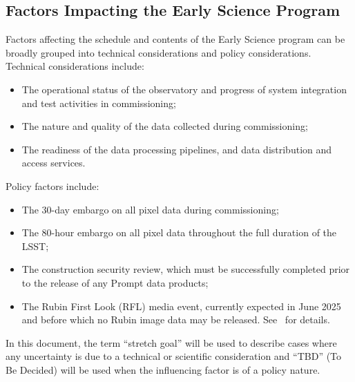 \subsection{Factors Impacting the Early Science Program}
\label{ssec:impact}

Factors affecting the schedule and contents of the Early Science program can be broadly grouped into technical considerations and policy considerations.
Technical considerations include:
\begin{itemize}
\item The operational status of the observatory and progress of system integration and test activities in commissioning;
\item The nature and quality of the data collected during commissioning;
\item The readiness of the data processing pipelines, and data distribution and access services.
\end{itemize}
Policy factors include:
\begin{itemize}
\item The 30-day embargo on all pixel data during commissioning;
\item The 80-hour embargo on all pixel data throughout the full duration of the LSST;
\item The  construction security review, which must be successfully completed prior to the release of any Prompt data products;
\item The Rubin First Look (RFL) media event, currently expected in June 2025 and before which  no Rubin image data may be released. See~ for details.
\end{itemize}
In this document, the term ``stretch goal'' will be used to describe cases where any uncertainty is due to a technical or scientific consideration and ``TBD'' (To Be Decided) will be used when the influencing factor is of a policy nature.
